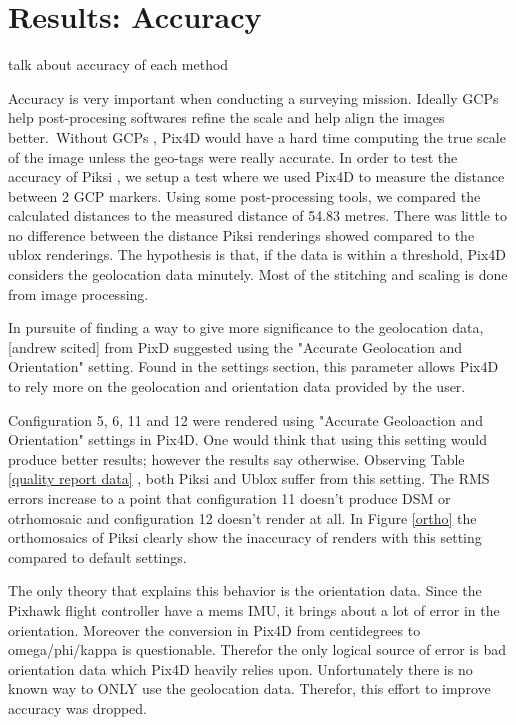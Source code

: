 \documentclass{article}
\begin{document}
\section{Results: Accuracy}
talk about accuracy of each method

Accuracy is very important when conducting a surveying mission. Ideally GCPs help post-procesing softwares refine the scale and help align the images better. Without GCPs , Pix4D would have a hard time computing the true scale of the image unless the geo-tags were really accurate. In order to test the accuracy of Piksi , we setup a test where we used Pix4D to measure the distance between 2 GCP markers. Using some post-processing tools, we compared the calculated distances to the measured distance of 54.83 metres. There was little to no difference between the distance Piksi renderings showed compared to the ublox renderings. The hypothesis is that, if the data is within a threshold, Pix4D considers the geolocation data minutely. Most of the stitching and scaling is done from image processing.

In pursuite of finding a way to give more significance to the geolocation data, [andrew scited] from PixD suggested using the "Accurate Geolocation and Orientation" setting. Found in the settings section, this parameter allows Pix4D to rely more on the geolocation and orientation data provided by the user.

Configuration 5, 6, 11 and 12 were rendered using "Accurate Geoloaction and Orientation" settings in Pix4D. One would think that using this setting would produce better results; however the results say otherwise. Observing Table \ref{quality report data} , both Piksi and Ublox suffer from this setting. The RMS errors increase to a point that configuration 11 doesn't produce DSM or otrhomosaic and configuration 12 doesn't render at all. In Figure \ref{ortho} the orthomosaics of Piksi clearly show the inaccuracy of renders with this setting compared to default settings.

The only theory that explains this behavior is the orientation data. Since the Pixhawk flight controller have a mems IMU, it brings about a lot of error in the orientation. Moreover the conversion in Pix4D from centidegrees to omega/phi/kappa is questionable. Therefor the only logical source of error is bad orientation data which Pix4D heavily relies upon. Unfortunately there is no known way to ONLY use the geolocation data. Therefor, this effort to improve accuracy was dropped.
\end{document}

